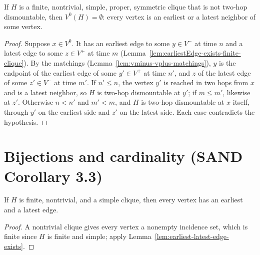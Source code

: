 \begin{lemma}
  \label{lem:vzero-empty}
  \leanok
  If $H$ is a finite, nontrivial, simple, proper, symmetric clique that is
  not two-hop dismountable, then $V^0(H) = \emptyset$: every vertex is an
  earliest or a latest neighbor of some vertex.
\end{lemma}

\begin{proof}
  \leanok
  Suppose $x \in V^0$. It has an earliest edge to some $y \in V^-$ at time $n$ and a latest edge to some $z \in V^+$ at time $m$ (Lemma~\ref{lem:earliestEdge-exists-finite-clique}). By the matchings (Lemma~\ref{lem:vminus-vplus-matchings}), $y$ is the endpoint of the earliest edge of some $y' \in V^+$ at time $n'$, and $z$ of the latest edge of some $z' \in V^-$ at time $m'$. If $n' \le n$, the vertex $y'$ is reached in two hops from $x$ and is a latest neighbor, so $H$ is two-hop dismountable at $y'$; if $m \le m'$, likewise at $z'$. Otherwise $n < n'$ and $m' < m$, and $H$ is two-hop dismountable at $x$ itself, through $y'$ on the earliest side and $z'$ on the latest side. Each case contradicts the hypothesis.
\end{proof}

\section*{Bijections and cardinality (SAND Corollary 3.3)}

\begin{lemma}
  \label{lem:earliestEdge-exists-finite-clique}
  \leanok
  If $H$ is finite, nontrivial, and a simple clique, then every vertex has an
  earliest and a latest edge.
\end{lemma}

\begin{proof}
  \leanok
  A nontrivial clique gives every vertex a nonempty incidence set, which is finite since $H$ is finite and simple; apply Lemma~\ref{lem:earliest-latest-edge-exists}.
\end{proof}

